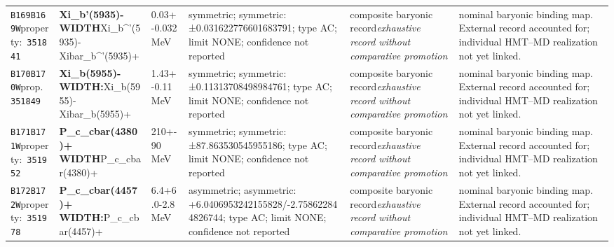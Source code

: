 \begin{landscape}
\begin{longtable}{L{1.85cm}L{4.45cm}L{2.35cm}L{4.05cm}L{3.35cm}L{7.15cm}}
\texttt{B169}\newline \texttt{B169W}\newline property:\ \texttt{351841} & \textbf{Xi\_\allowbreak{}b'(5935)- WIDTH}\newline Xi\_\allowbreak{}b\textasciicircum{}'(5935)- \textbar{}\allowbreak{} Xibar\_\allowbreak{}b\textasciicircum{}'(5935)+ & 0.03+-0.032\,MeV & symmetric; symmetric: ±0.031622776601683791; type AC; limit NONE; confidence not reported & composite baryonic record\newline \emph{exhaustive record without comparative promotion} & nominal baryonic binding map. External record accounted for; individual HMT--MD realization not yet linked. \\
\texttt{B170}\newline \texttt{B170W}\newline prop.\ \texttt{351849} & \textbf{Xi\_\allowbreak{}b(5955)- WIDTH:}\newline Xi\_\allowbreak{}b(5955)- \textbar{}\allowbreak{} Xibar\_\allowbreak{}b(5955)+ & 1.43+-0.11\,MeV & symmetric; symmetric: ±0.11313708498984761; type AC; limit NONE; confidence not reported & composite baryonic record\newline \emph{exhaustive record without comparative promotion} & nominal baryonic binding map. External record accounted for; individual HMT--MD realization not yet linked. \\
\texttt{B171}\newline \texttt{B171W}\newline property:\ \texttt{351952} & \textbf{P\_\allowbreak{}c\_\allowbreak{}cbar(4380)+ WIDTH}\newline P\_\allowbreak{}c\_\allowbreak{}cbar(4380)+ & 210+-90\,MeV & symmetric; symmetric: ±87.863530545955186; type AC; limit NONE; confidence not reported & composite baryonic record\newline \emph{exhaustive record without comparative promotion} & nominal baryonic binding map. External record accounted for; individual HMT--MD realization not yet linked. \\
\texttt{B172}\newline \texttt{B172W}\newline property:\ \texttt{351978} & \textbf{P\_\allowbreak{}c\_\allowbreak{}cbar(4457)+ WIDTH:}\newline P\_\allowbreak{}c\_\allowbreak{}cbar(4457)+ & 6.4+6.0-2.8\,MeV & asymmetric; asymmetric: +6.0406953242155828/-2.758622844826744; type AC; limit NONE; confidence not reported & composite baryonic record\newline \emph{exhaustive record without comparative promotion} & nominal baryonic binding map. External record accounted for; individual HMT--MD realization not yet linked. \\

\end{longtable}
\end{landscape}
